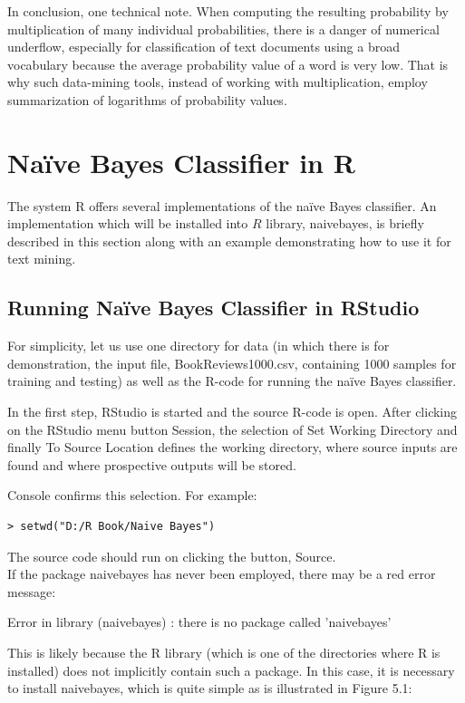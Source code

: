 \documentclass[11pt,openany,executivepaper]{book}
\begin{document}
In conclusion, one technical note. When computing the resulting probability by multiplication of many individual probabilities, there is a danger of numerical underflow, especially for classification of text documents using a broad vocabulary because the average probability value of a word is very low. That is why such data-mining tools, instead of working with multiplication, employ summarization of logarithms of probability values.

\section{Naïve Bayes Classifier in R}
The system R offers several implementations of the naïve Bayes classifier. An implementation which will be installed into $R$ library, naivebayes, is briefly
described in this section along with an example demonstrating how to use it for text mining.

\subsection{Running Naïve Bayes Classifier in RStudio}
For simplicity, let us use one directory for data (in which there is for demonstration, the input file, BookReviews1000.csv, containing 1000 samples for training and testing) as well as the R-code for running the naïve Bayes classifier.

In the first step, RStudio is started and the source R-code is open. After clicking on the RStudio menu button Session, the selection of Set Working Directory and finally To Source Location defines the working directory, where source inputs are found and where prospective outputs will be stored.

Console confirms this selection. For example:

\begin{verbatim}
> setwd("D:/R Book/Naive Bayes")
\end{verbatim}

The source code should run on clicking the button, Source.\\
If the package naivebayes has never been employed, there may be a red error message:

Error in library (naivebayes) : there is no package called 'naivebayes'

This is likely because the R library (which is one of the directories where R is installed) does not implicitly contain such a package. In this case, it is necessary to install naivebayes, which is quite simple as is illustrated in Figure 5.1:
\end{document}
